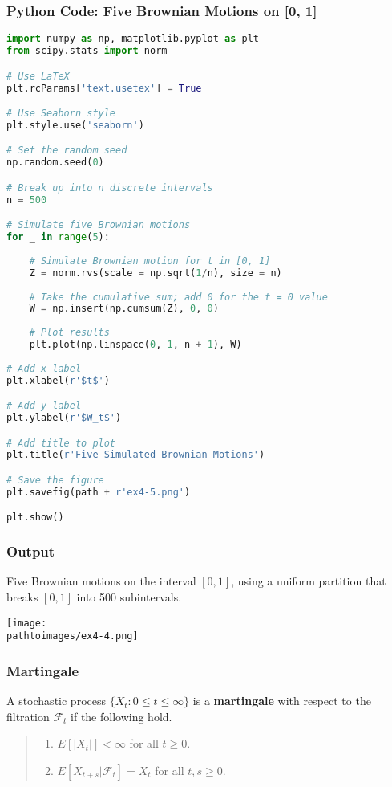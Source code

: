 \documentclass{beamer}
\newcommand{\pathtoimages}{/Users/charlesrambo/Desktop/Bootcamp24/Images}
\begin{document}
\begin{frame}[fragile]
\frametitle{Python Code: Five Brownian Motions on [0, 1]}

\begin{multicols}{2}
\begin{lstlisting}[language=Python]
import numpy as np, matplotlib.pyplot as plt
from scipy.stats import norm

# Use LaTeX
plt.rcParams['text.usetex'] = True

# Use Seaborn style
plt.style.use('seaborn')

# Set the random seed
np.random.seed(0)

# Break up into n discrete intervals
n = 500

# Simulate five Brownian motions
for _ in range(5):
    
    # Simulate Brownian motion for t in [0, 1]
    Z = norm.rvs(scale = np.sqrt(1/n), size = n)
    
    # Take the cumulative sum; add 0 for the t = 0 value
    W = np.insert(np.cumsum(Z), 0, 0)
    
    # Plot results
    plt.plot(np.linspace(0, 1, n + 1), W)
    
# Add x-label
plt.xlabel(r'$t$')

# Add y-label
plt.ylabel(r'$W_t$')

# Add title to plot
plt.title(r'Five Simulated Brownian Motions')

# Save the figure
plt.savefig(path + r'ex4-5.png')

plt.show()
\end{lstlisting}
\end{multicols}
\end{frame}

\begin{frame}
\frametitle{Output}
Five Brownian motions on the interval $[0, 1]$, using a uniform partition that breaks $[0, 1]$ into 500 subintervals. 
\begin{center}
\texttt{[image: \\pathtoimages/ex4-4.png]}
\end{center}

\end{frame}


\begin{frame}
\frametitle{Martingale} 

\begin{Definition}
A stochastic process $\{X_t : 0\leq t \leq\infty\}$ is a {\bf martingale} with respect to the filtration $\mathcal{F}_t$ if the following hold.
\medskip

\begin{quote}
\begin{enumerate}
\item[M.1] $E\left[|X_t|\right] <\infty$ for all $t\geq 0$.
\item[M.2] $E\left[ X_{t + s} | \mathcal{F}_t\right] = X_t$ for all $t, s \geq 0$.
\end{enumerate}
\end{quote}
\end{Definition}

\end{frame}
\end{document}
